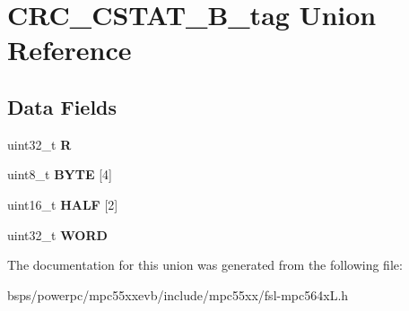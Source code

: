 \hypertarget{unionCRC__CSTAT__32B__tag}{}\section{C\+R\+C\+\_\+\+C\+S\+T\+A\+T\+\_\+B\+\_\+tag Union Reference}
\label{unionCRC__CSTAT__32B__tag}
\subsection*{Data Fields}
\begin{DoxyCompactItemize}
\item 
\mbox{\label{unionCRC__CSTAT__32B__tag_aa93cb68eae7c271f17d1a949ddf757f7}} 
uint32\+\_\+t {\bfseries R}
\item 
\mbox{\label{unionCRC__CSTAT__32B__tag_ade0a223a656b61dae1a12f11856a02a2}} 
uint8\+\_\+t {\bfseries B\+Y\+TE} \mbox{[}4\mbox{]}
\item 
\mbox{\label{unionCRC__CSTAT__32B__tag_a4a1c269e372251fef80464cab723b83b}} 
uint16\+\_\+t {\bfseries H\+A\+LF} \mbox{[}2\mbox{]}
\item 
\mbox{\label{unionCRC__CSTAT__32B__tag_a69e0861d75fb1087f15928bb8264633a}} 
uint32\+\_\+t {\bfseries W\+O\+RD}
\end{DoxyCompactItemize}


The documentation for this union was generated from the following file\+:\begin{DoxyCompactItemize}
\item 
bsps/powerpc/mpc55xxevb/include/mpc55xx/fsl-\/mpc564x\+L.\+h\end{DoxyCompactItemize}
